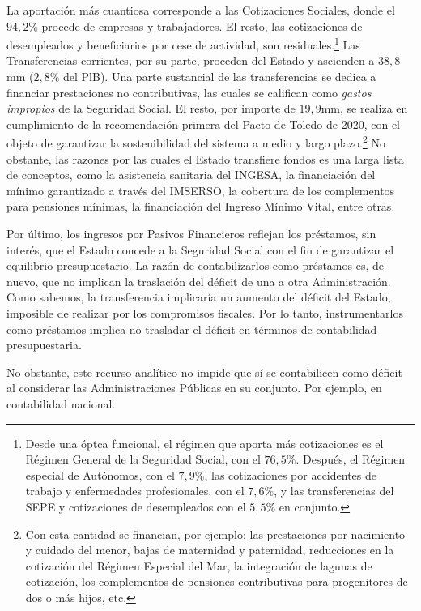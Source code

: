 \documentclass[10pt,a4paper]{article}
\begin{document}
La aportación más cuantiosa corresponde a las Cotizaciones Sociales, donde el $94,2\%$ procede de empresas y trabajadores. El resto, las cotizaciones de desempleados y beneficiarios por cese de actividad, son residuales.\footnote{%
    Desde una óptca funcional, el régimen que aporta más cotizaciones es el Régimen General de la Seguridad Social, con el $76,5\%$. Después, el Régimen especial de Autónomos, con el $7,9\%$, las cotizaciones por accidentes de trabajo y enfermedades profesionales, con el $7,6\%$, y las transferencias del SEPE y cotizaciones de desempleados con el $5,5\%$ en conjunto.
} Las Transferencias corrientes, por su parte, proceden del Estado y ascienden a $38,8$mm ($2,8\%$ del PlB). Una parte sustancial de las transferencias se dedica a financiar prestaciones no contributivas, las cuales se califican como \textit{gastos impropios} de la Seguridad Social. El resto, por importe de $19,9$mm, se realiza en cumplimiento de la recomendación primera del Pacto de Toledo de 2020, con el objeto de garantizar la sostenibilidad del sistema a medio y largo plazo.\footnote{%
    Con esta cantidad se financian, por ejemplo: las prestaciones por nacimiento y cuidado del menor, bajas de maternidad y paternidad, reducciones en la cotización del Régimen Especial del Mar, la integración de lagunas de cotización, los complementos de pensiones contributivas para progenitores de dos o más hijos, etc.
} No obstante, las razones por las cuales el Estado transfiere fondos es una larga lista de conceptos, como la asistencia sanitaria del INGESA, la financiación del mínimo garantizado a través del IMSERSO, la cobertura de los complementos para pensiones mínimas, la financiación del Ingreso Mínimo Vital, entre otras.

Por último, los ingresos por Pasivos Financieros reflejan los préstamos, sin interés, que el Estado concede a la Seguridad Social con el fin de garantizar el equilibrio presupuestario. La razón de contabilizarlos como préstamos es, de nuevo, que no implican la traslación del déficit de una a otra Administración. Como sabemos, la transferencia implicaría un aumento del déficit del Estado, imposible de realizar por los compromisos fiscales. Por lo tanto, instrumentarlos como préstamos implica no trasladar el déficit en términos de contabilidad presupuestaria. 

No obstante, este recurso analítico no impide que sí se contabilicen como déficit al considerar las Administraciones Públicas en su conjunto. Por ejemplo, en contabilidad nacional.
\end{document}
